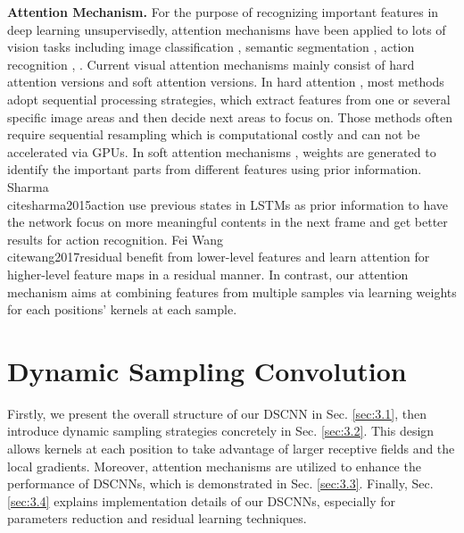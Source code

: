 \documentclass[runningheads]{llncs}
\begin{document}
\noindent\textbf{Attention Mechanism.}
For the purpose of recognizing important features in deep learning unsupervisedly, attention mechanisms have been applied to lots of vision tasks including image classification \cite{wang2017residual}, semantic segmentation \cite{harley2017segmentation}, action recognition \cite{sharma2015action,wu2016action}, \etc. 
Current visual attention mechanisms mainly consist of hard attention versions and soft attention versions. In hard attention \cite{mnih2014recurrent,ba2014multiple}, most methods adopt sequential processing strategies, which extract features from one or several specific image areas and then decide next areas to focus on. Those methods often require sequential resampling which is computational costly and can not be accelerated via GPUs. In soft attention mechanisms \cite{sharma2015action,xu2015show,wang2017residual}, weights are generated to identify the important parts from different features using prior information. 
Sharma \etal\\cite{sharma2015action} use previous states in LSTMs as prior information to have the network focus on more meaningful contents in the next frame and get better results for action recognition. Fei Wang \etal\\cite{wang2017residual} benefit from lower-level features and learn attention for higher-level feature maps in a residual manner. In contrast, our attention mechanism aims at combining features from multiple samples via learning weights for each positions' kernels at each sample.

\section{Dynamic Sampling Convolution}
Firstly, we present the overall structure of our DSCNN in Sec. \ref{sec:3.1}, then introduce dynamic sampling strategies concretely in Sec. \ref{sec:3.2}. This design allows kernels at each position to take advantage of larger receptive fields and the local gradients. Moreover, attention mechanisms are utilized to enhance the performance of DSCNNs, which is demonstrated in Sec. \ref{sec:3.3}. Finally, Sec. \ref{sec:3.4} explains implementation details of our DSCNNs, especially for parameters reduction and residual learning techniques.
\end{document}
